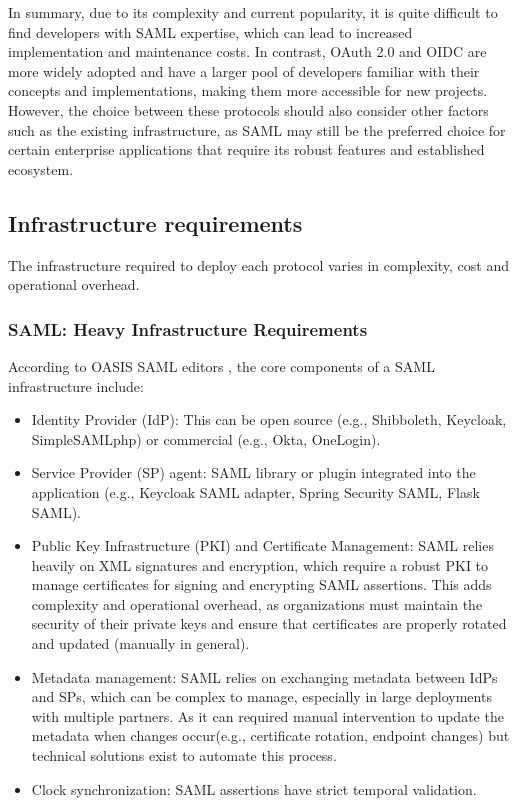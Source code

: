 \documentclass[../memoire.tex]{subfiles}
\begin{document}
In summary, due to its complexity and current popularity, it is quite difficult to find developers with SAML expertise, which can lead to increased implementation and maintenance costs. In contrast, OAuth 2.0 and OIDC are more widely adopted and have a larger pool of developers familiar with their concepts and implementations, making them more accessible for new projects. However, the choice between these protocols should also consider other factors such as the existing infrastructure, as SAML may still be the preferred choice for certain enterprise applications that require its robust features and established ecosystem.

\subsection{Infrastructure requirements}

The infrastructure required to deploy each protocol varies in complexity, cost and operational overhead.

\subsubsection{SAML: Heavy Infrastructure Requirements}

According to OASIS SAML editors \cite{oasissaml}, the core components of a SAML infrastructure include:

\begin{itemize}
    \item Identity Provider (IdP):  This can be open source (e.g., Shibboleth, Keycloak, SimpleSAMLphp) or commercial (e.g., Okta, OneLogin). 
    \item Service Provider (SP) agent: SAML library or plugin integrated into the application (e.g., Keycloak SAML adapter, Spring Security SAML, Flask SAML).
    \item Public Key Infrastructure (PKI) and Certificate Management: SAML relies heavily on XML signatures and encryption, which require a robust PKI to manage certificates for signing and encrypting SAML assertions. This adds complexity and operational overhead, as organizations must maintain the security of their private keys and ensure that certificates are properly rotated and updated (manually in general).
    \item Metadata management: SAML relies on exchanging metadata between IdPs and SPs, which can be complex to manage, especially in large deployments with multiple partners. As it can required manual intervention to update the metadata when changes occur(e.g., certificate rotation, endpoint changes) but technical solutions exist to automate this process\cite[p.~139]{wilson2022}.  
    \item Clock synchronization: SAML assertions have strict temporal validation\cite[p.~139]{wilson2022}. 
\end{itemize}
\end{document}
